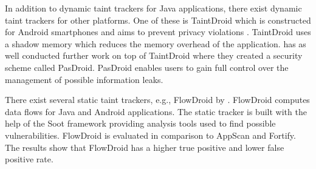 In addition to dynamic taint trackers for Java applications, there exist dynamic taint trackers for other platforms. One of these is TaintDroid which is constructed for Android smartphones and aims to prevent privacy violations \parencite{EnckWilliam2014Taif}. TaintDroid uses a shadow memory which reduces the memory overhead of the application. \textcite{HsiaoS.W.2014PRse} has as well conducted further work on top of TaintDroid where they created a security scheme called PasDroid. PasDroid enables users to gain full control over the management of possible information leaks.

There exist several static taint trackers, e.g., FlowDroid by \textcite{ArztS.2014FPcf}. FlowDroid computes data flows for Java and Android applications. The static tracker is built with the help of the Soot framework \parencite{soot} providing analysis tools used to find possible vulnerabilities. FlowDroid is evaluated in comparison to AppScan and Fortify. The results show that FlowDroid has a higher true positive and lower false positive rate.